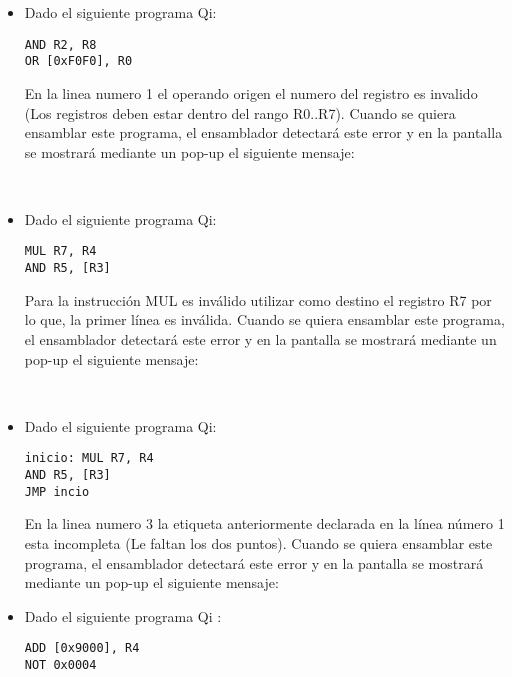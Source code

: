 \begin{itemize}
 \\ 

\item Dado el siguiente programa Qi:

\begin{verbatim}
AND R2, R8
OR [0xF0F0], R0
\end{verbatim}

En la linea numero 1 el operando origen el numero del registro es invalido (Los registros deben estar dentro del rango R0..R7). Cuando se quiera ensamblar este programa, el ensamblador detectará este error y en la pantalla se mostrará mediante un pop-up el siguiente mensaje:

 \\ 

\item Dado el siguiente programa Qi:

\begin{verbatim}
MUL R7, R4
AND R5, [R3]
\end{verbatim}

Para la instrucción MUL es inválido utilizar como destino el registro R7 por lo que, la primer línea es inválida. Cuando se quiera ensamblar este programa, el ensamblador detectará este error y en la pantalla se mostrará mediante un pop-up el siguiente mensaje:

 \\ 

\item Dado el siguiente programa Qi:

\begin{verbatim}
inicio: MUL R7, R4
AND R5, [R3]
JMP incio
\end{verbatim}

En la linea numero 3 la etiqueta anteriormente declarada en la línea número 1 esta incompleta (Le faltan los dos puntos). Cuando se quiera ensamblar este programa, el ensamblador detectará este error y en la pantalla se mostrará mediante un pop-up el siguiente mensaje:



\item Dado el siguiente programa Qi :

\begin{verbatim}
ADD [0x9000], R4
NOT 0x0004
\end{verbatim}


\end{itemize}
